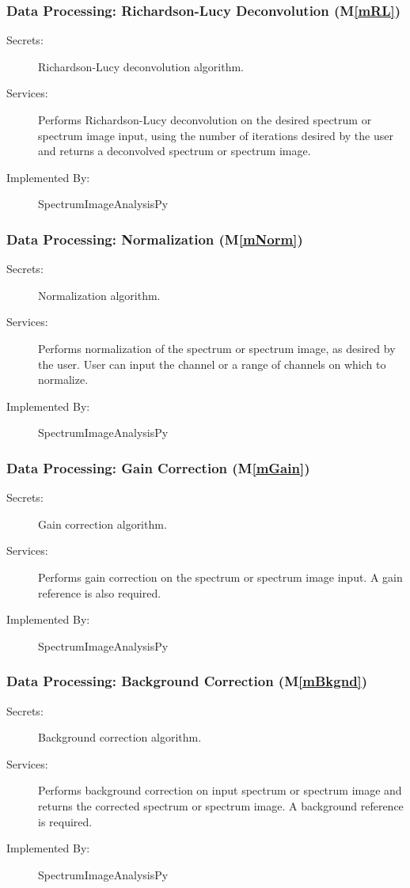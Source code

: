 \documentclass[12pt, titlepage]{article}
\newcommand{\mref}[1]{M\ref{#1}}
\newcommand{\progname}{SpectrumImageAnalysisPy}
\begin{document}
\subsubsection{Data Processing: Richardson-Lucy Deconvolution (\mref{mRL})}
\begin{description}
	\item[Secrets:]Richardson-Lucy deconvolution algorithm.
	\item[Services:]Performs Richardson-Lucy deconvolution on the desired spectrum or spectrum image input, using the number of iterations desired by the user and returns a deconvolved spectrum or spectrum image. 
	\item[Implemented By:] \progname
\end{description}

\subsubsection{Data Processing: Normalization (\mref{mNorm})}
\begin{description}
	\item[Secrets:]Normalization algorithm.
	\item[Services:]Performs normalization of the spectrum or spectrum image, as desired by the user. User can input the channel or a range of channels on which to normalize.
	\item[Implemented By:] \progname
\end{description}

\subsubsection{Data Processing: Gain Correction (\mref{mGain})}
\begin{description}
	\item[Secrets:]Gain correction algorithm.
	\item[Services:] Performs gain correction on the spectrum or spectrum image input. A gain reference is also required.
	\item[Implemented By:] \progname
\end{description}

\subsubsection{Data Processing: Background Correction (\mref{mBkgnd})}
\begin{description}
	\item[Secrets:]Background correction algorithm.
	\item[Services:]Performs background correction on input spectrum or spectrum image and returns the corrected spectrum or spectrum image. A background reference is required.
	\item[Implemented By:] \progname
\end{description}
\end{document}
